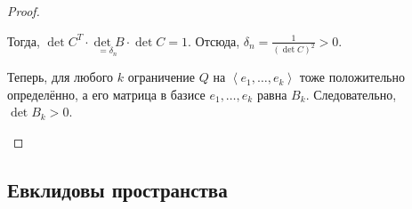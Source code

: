 \documentclass[a4paper]{article}
\begin{document}
\begin{colloq}
\begin{proof}
\begin{description}
                    Тогда, $\det C^T \cdot \underset{= \delta_n}{\det B} \cdot \det C = 1$. Отсюда, $\delta_n = \frac{1}{(\det C)^2} > 0$.

                    Теперь, для любого $k$ ограничение $Q$ на $\left< e_1, \dots, e_k \right>$ тоже положительно определённо, а его матрица в базисе $e_1, \dots, e_k$ равна $B_k$. Следовательно, $\det B_k > 0$.
                    \qedhere
                \end{description}
            \end{proof}

    \end{colloq}

    \subsection{Евклидовы пространства}
\end{document}
